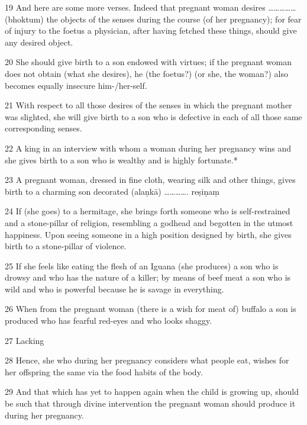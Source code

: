 \begin{translation}
\begin{tt}
\item[19]And here are some more verses. Indeed that pregnant woman desires 
…………… (bhoktum) the objects of the senses during the course (of her 
pregnancy); for fear of injury to the foetus a physician, after having fetched these 
things, should give any desired object.

\item[20]She should give birth to a son endowed with virtues; if the pregnant 
woman does not obtain (what she desires), he (the foetus?) (or she, the woman?) 
also becomes equally insecure him-/her-self.

\item[21]With respect to all those desires of the senses in which the pregnant 
mother was slighted, she will give birth to a son who is defective in each of all 
those same corresponding senses.

\item[22]A king in an interview with whom a woman during her pregnancy wins 
and she gives birth to a son who is wealthy and is highly fortunate.*

\item[23]A pregnant woman, dressed in fine cloth, wearing silk and other things, 
gives birth to a charming son decorated (alaṇkā) …………. reṣiṇaṃ


\item[24]If (she goes) to a hermitage, she brings forth someone who is 
self-restrained and a stone-pillar of religion, resembling a godhead and begotten 
in the utmost happiness. Upon seeing someone in a high position designed by 
birth, she gives birth to a stone-pillar of violence.

\item[25]If she feels like eating the flesh of an Iguana (she produces) a son who 
is drowsy and who has the nature of a killer; by means of beef meat a son who is 
wild and who is powerful because he is savage in everything.

\item[26] When from the pregnant woman (there is a wish for meat of) buffalo a 
son is produced who has fearful red-eyes and who looks shaggy.

\item[27]Lacking

\item[28]Hence, she who during her pregnancy considers what people eat, 
wishes for her offspring the same via the food habits of the body.

\item[29] And that which has yet to happen again when the child is growing up, 
should be such that through divine intervention the pregnant woman should 
produce it during her pregnancy. 


\end{tt}
\end{translation}
